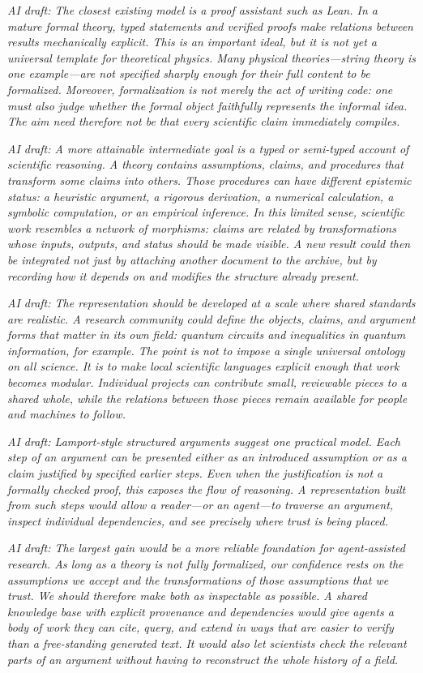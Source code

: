\documentclass[11pt,a4paper]{article}
\newcommand{\AI}[1]{{\color{blue}\textit{AI draft: #1}}}
\begin{document}
\AI{The closest existing model is a proof assistant such as Lean.  In a mature
formal theory, typed statements and verified proofs make relations between
results mechanically explicit.  This is an important ideal, but it is not yet
a universal template for theoretical physics.  Many physical theories---string
theory is one example---are not specified sharply enough for their full content
to be formalized.  Moreover, formalization is not merely the act of writing
code: one must also judge whether the formal object faithfully represents the
informal idea.  The aim need therefore not be that every scientific claim
immediately compiles.}

\AI{A more attainable intermediate goal is a typed or semi-typed account of
scientific reasoning.  A theory contains assumptions, claims, and procedures
that transform some claims into others.  Those procedures can have different
epistemic status: a heuristic argument, a rigorous derivation, a numerical
calculation, a symbolic computation, or an empirical inference.  In this
limited sense, scientific work resembles a network of morphisms: claims are
related by transformations whose inputs, outputs, and status should be made
visible.  A new result could then be integrated not just by attaching another
document to the archive, but by recording how it depends on and modifies the
structure already present.}

\AI{The representation should be developed at a scale where shared standards
are realistic.  A research community could define the objects, claims, and
argument forms that matter in its own field: quantum circuits and inequalities
in quantum information, for example.  The point is not to impose a single
universal ontology on all science.  It is to make local scientific languages
explicit enough that work becomes modular.  Individual projects can contribute
small, reviewable pieces to a shared whole, while the relations between those
pieces remain available for people and machines to follow.}

\AI{Lamport-style structured arguments suggest one practical model.  Each step
of an argument can be presented either as an introduced assumption or as a
claim justified by specified earlier steps.  Even when the justification is not
a formally checked proof, this exposes the flow of reasoning.  A representation
built from such steps would allow a reader---or an agent---to traverse an
argument, inspect individual dependencies, and see precisely where trust is
being placed.}

\AI{The largest gain would be a more reliable foundation for agent-assisted
research.  As long as a theory is not fully formalized, our confidence rests on
the assumptions we accept and the transformations of those assumptions that we
trust.  We should therefore make both as inspectable as possible.  A shared
knowledge base with explicit provenance and dependencies would give agents a
body of work they can cite, query, and extend in ways that are easier to verify
than a free-standing generated text.  It would also let scientists check the
relevant parts of an argument without having to reconstruct the whole history
of a field.}
\end{document}
